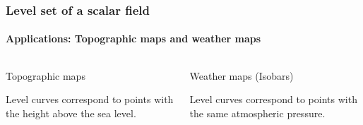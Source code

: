 \begin{frame}
\frametitle{Level set of a scalar field}
\framesubtitle{Applications: Topographic maps and weather maps}
\begin{columns}
\begin{column}{0.5\textwidth}
\begin{center}
Topographic maps
\end{center}
Level curves correspond to points with the height above the sea level.
\end{column}
\begin{column}{0.5\textwidth}
\begin{center}
Weather maps (Isobars)
\end{center}
Level curves correspond to points with the same atmospheric pressure.
\end{column}
\end{columns}
\end{frame}


